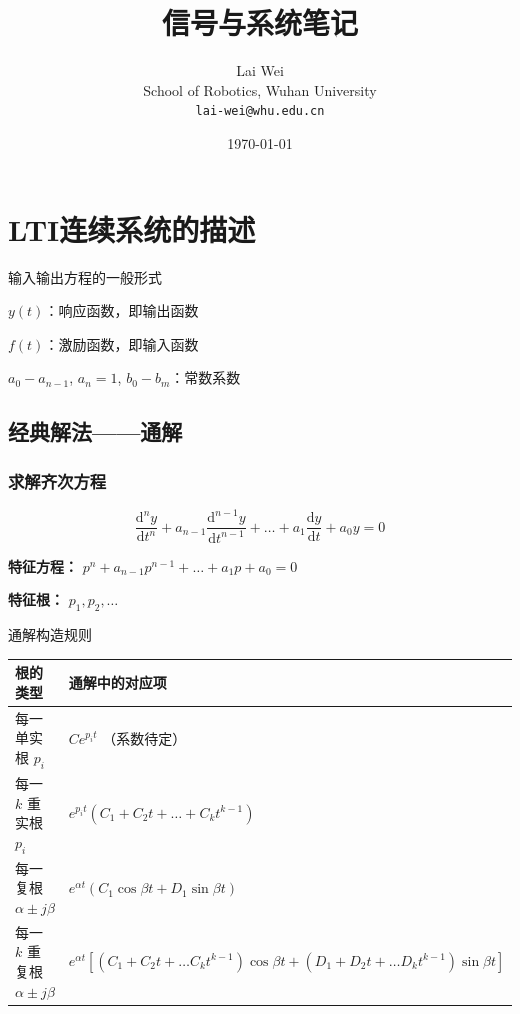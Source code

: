 \documentclass[UTF8]{ctexart}
\title{信号与系统笔记}
\author{Lai Wei \\ School of Robotics, Wuhan University \\ \texttt{lai-wei@whu.edu.cn}}
\date{\today}
\begin{document}
\maketitle

\tableofcontents

\newpage

\section{LTI连续系统的描述}

输入输出方程的一般形式

$y(t)$：响应函数，即输出函数

$f(t)$：激励函数，即输入函数

$a_0 -a_{n-1}$, $a_n=1$, $b_0 -b_m$：常数系数

\subsection{经典解法——通解}

\subsubsection{求解齐次方程}

$$
\dfrac{\mathrm{d}^n y}{\mathrm{d}t^n} + a_{n-1}\dfrac{\mathrm{d}^{n-1}y}{\mathrm{d}t^{n-1}} + \ldots + a_1\dfrac{\mathrm{d}y}{\mathrm{d}t} + a_0 y = 0
$$

\textbf{特征方程：} $p^n + a_{n-1}p^{n-1} + \ldots + a_1 p + a_0 = 0$

\textbf{特征根：} $p_1, p_2, \ldots$

通解构造规则

\begin{table}[H]
\centering
\begin{tabular}{l|l}
\hline
\textbf{根的类型} & \textbf{通解中的对应项} \\
\hline
每一单实根 $p_i$ & $C e^{p_i t}$ （系数待定） \\
\hline
每一 $k$ 重实根 $p_i$ & $e^{p_i t}(C_1 + C_2 t + \ldots + C_k t^{k-1})$ \\
\hline
每一复根 $\alpha \pm j\beta$ & $e^{\alpha t}(C_1 \cos\beta t + D_1 \sin\beta t)$ \\
\hline
每一 $k$ 重复根 $\alpha \pm j\beta$ & $e^{\alpha t}\left[(C_1 + C_2 t + \ldots C_k t^{k-1})\cos\beta t + (D_1 + D_2 t + \ldots D_k t^{k-1})\sin\beta t\right]$ \\
\hline
\end{tabular}
\end{table}
\end{document}
